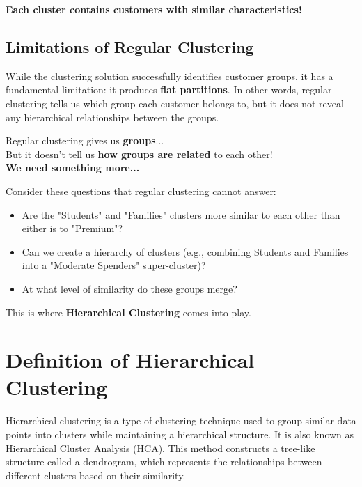 \documentclass{article}
\begin{document}
\begin{tcolorbox}[title=Key Insight]
\centering
\large
\textbf{Each cluster contains customers with similar characteristics!}
\end{tcolorbox}

\subsection{Limitations of Regular Clustering}

While the clustering solution successfully identifies customer groups, it has a fundamental limitation: it produces \textbf{flat partitions}. In other words, regular clustering tells us which group each customer belongs to, but it does not reveal any hierarchical relationships between the groups.

\begin{tcolorbox}[title=What's Missing?]
\centering
\Large
Regular clustering gives us \textbf{groups}... \\[0.3cm]
But it doesn't tell us \textbf{how groups are related} to each other! \\[0.3cm]
\textbf{We need something more...}
\end{tcolorbox}

Consider these questions that regular clustering cannot answer:
\begin{itemize}
    \item Are the "Students" and "Families" clusters more similar to each other than either is to "Premium"?
    \item Can we create a hierarchy of clusters (e.g., combining Students and Families into a "Moderate Spenders" super-cluster)?
    \item At what level of similarity do these groups merge?
\end{itemize}

This is where \textbf{Hierarchical Clustering} comes into play.

\section{Definition of Hierarchical Clustering}

Hierarchical clustering is a type of clustering technique used to group similar data points into clusters while maintaining a hierarchical structure. It is also known as Hierarchical Cluster Analysis (HCA). This method constructs a tree-like structure called a dendrogram, which represents the relationships between different clusters based on their similarity.
\end{document}
